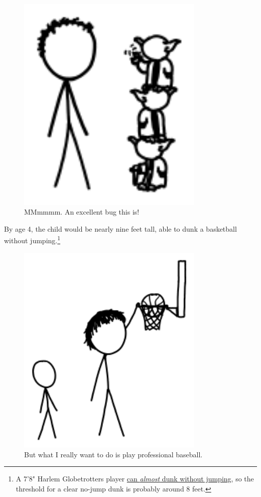 {\begin{figure}[!htbp]
\centering
\includegraphics[scale=0.5, max width=0.8\textwidth]{imgs/a/77/height_yoda.png}
\caption{MMmmmm. An excellent bug this is!}
\end{figure}

{By age 4, the child would be nearly nine feet tall, able to dunk a basketball without jumping.{\footnote{A 7'8" Harlem Globetrotters player \href{http://www.youtube.com/watch?v=HTnC0RBXwws}{can \emph{almost} dunk without jumping}, so the threshold for a clear no-jump dunk is probably around 8 feet.} } }

\begin{figure}[!htbp]
\centering
\includegraphics[scale=0.5, max width=0.8\textwidth]{imgs/a/77/height_4.png}
\caption{But what I really want to do is play professional baseball.}
\end{figure}

}
